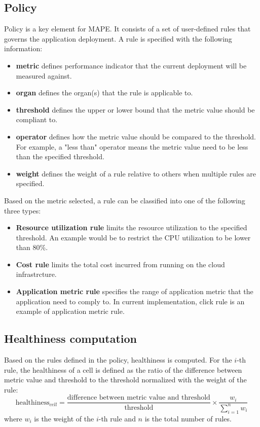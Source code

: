 \documentclass{seal_thesis}
\begin{document}
\subsection{Policy}
Policy is a key element for MAPE.
It consists of a set of user-defined rules that governs the application deployment.
A rule is specified with the following information:
\begin{itemize}
\item \textbf{metric} defines performance indicator that the current deployment will be measured against.
\item \textbf{organ} defines the organ(s) that the rule is applicable to.
\item \textbf{threshold} defines the upper or lower bound that the metric value should be compliant to.
\item \textbf{operator} defines how the metric value should be compared to the threshold.
For example, a "less than" operator means the metric value need to be less than the specified threshold.
\item \textbf{weight} defines the weight of a rule relative to others when multiple rules are specified.
\end{itemize}
Based on the metric selected, a rule can be classified into one of the following three types:
\begin{itemize}
\item \textbf{Resource utilization rule} limits the resource utilization to the specified threshold.
An example would be to restrict the CPU utilization to be lower than 80\%.
\item \textbf{Cost rule} limits the total cost incurred from running on the cloud infrastrcture.
\item \textbf{Application metric rule} specifies the range of application metric that the application need to comply to.
In current implementation, click rule is an example of application metric rule.
\end{itemize}

\subsection{Healthiness computation}
Based on the rules defined in the policy, healthiness is computed.
For the $i$-th rule, the healthiness of a cell is defined as the ratio of the difference between metric value and threshold to the threshold normalized with the weight of the rule:
\[ \textrm{healthiness}_{cell} = \frac{\textrm{difference between metric value and threshold}}{\textrm{threshold}} \times \frac{w_i}{\sum_{i=1}^{n}{w_i}}\]
where $w_i$ is the weight of the $i$-th rule and $n$ is the total number of rules.
\end{document}
